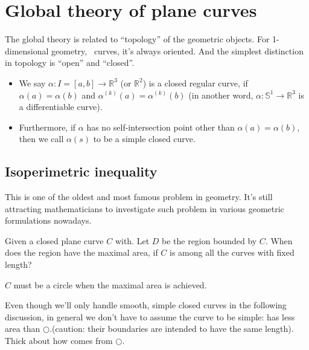 \section{Global theory of plane curves}

The global theory is related to ``topology'' of the geometric objects.
For 1-dimensional geometry, \ie\ curves, it's always oriented. And the simplest distinction in topology
is ``open'' and ``closed''.

\begin{definition}
    \begin{itemize}\hfill
        \item We say
              \(\alpha\colon I=[a,b]\to \mathbb{R}
              ^3\)
              (or \(\mathbb{R}^2\))
              is a closed regular curve, if
              \(\alpha(a)=\alpha(b)\)
              and
              \(\alpha^{(k)}
              (a)=\alpha^{(k)}(b)\)
              (in another word,
              \(\alpha\colon \mathbb{S}^1\to \mathbb{R}^3\)
              is a differentiable curve).
        \item Furthermore, if
              \(\alpha\)
              has no
              self-intersection point other than
              $\alpha(a)=\alpha(b)$,
              then we call $\alpha(s)$ to be a simple closed curve.
    \end{itemize}
\end{definition}
\begin{center}
\end{center}

\subsection{Isoperimetric inequality}
This is one of the oldest and most famous problem in geometry. It's still attracting mathematicians to investigate such problem in various geometric formulations nowadays.
\begin{question}
    Given a closed plane curve \(C\) with. Let \(D\) be the
    region bounded by \(C\). When does the region have the
    maximal area, if \(C\) is among all the curves with
    fixed length?
\end{question}
\begin{answer}
    \(C\) must be a circle when the maximal area is
    achieved.
\end{answer}
\begin{remark}
    Even though we'll only handle smooth, simple closed
    curves in the following discussion, in general we
    don't have to assume the curve to be simple:
    {\ooalign{$\bigcirc $\cr $\ \ \,\bigcirc $}}
    has less area than $\bigcirc $.(caution: their boundaries are intended to have the same length). Thick about how
        {\ooalign{$\bigcirc $\cr $\ \ \,\bigcirc $}}
    comes from $\bigcirc $.
\end{remark}

